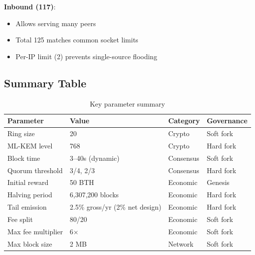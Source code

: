\textbf{Inbound (117)}:
\begin{itemize}
  \item Allows serving many peers
  \item Total 125 matches common socket limits
  \item Per-IP limit (2) prevents single-source flooding
\end{itemize}

\subsection{Summary Table}

\begin{table}[h]
\centering
\caption{Key parameter summary}
\label{tab:params-summary}
\begin{tabular}{@{}llll@{}}
\toprule
\textbf{Parameter} & \textbf{Value} & \textbf{Category} & \textbf{Governance} \\
\midrule
Ring size & 20 & Crypto & Soft fork \\
ML-KEM level & 768 & Crypto & Hard fork \\
Block time & 3--40s (dynamic) & Consensus & Soft fork \\
Quorum threshold & 3/4, 2/3 & Consensus & Hard fork \\
Initial reward & 50 BTH & Economic & Genesis \\
Halving period & 6,307,200 blocks & Economic & Hard fork \\
Tail emission & 2.5\% gross/yr (2\% net design) & Economic & Hard fork \\
Fee split & 80/20 & Economic & Soft fork \\
Max fee multiplier & 6$\times$ & Economic & Soft fork \\
Max block size & 2 MB & Network & Soft fork \\
\bottomrule
\end{tabular}
\end{table}

